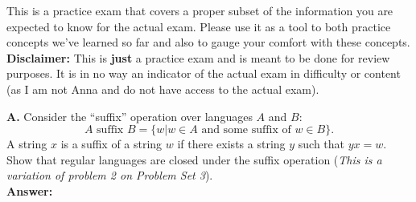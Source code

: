 \documentclass[10pt]{article}
\begin{document}
\noindent
This is a practice exam that covers a proper subset of the information you are expected to know for the actual exam. Please use it as a tool to both practice concepts we've learned so far and also to gauge your comfort with these concepts.\\

\noindent
\textbf{Disclaimer: }This is \textbf{just} a practice exam and is meant to be done for review purposes. It is in no way an indicator of the actual exam in difficulty or content (as I am not Anna and do not have access to the actual exam).

\newpage
\noindent
\textbf{A.} Consider the ``suffix'' operation over languages $A$ and $B$:
\[A\text{ suffix } B=\{w|w\in A \text{ and some suffix of }w\in B \}.\]
A string $x$ is a suffix of a string $w$ if there exists a string $y$ such that $yx=w.$ Show that regular languages are closed under the suffix operation
(\textit{This is a variation of problem 2 on Problem Set 3}).\\

\noindent
\textbf{Answer:}
\end{document}
